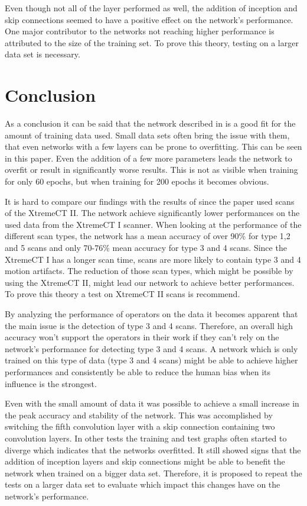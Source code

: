 \documentclass[
a4paper, 
12pt,
grayscalebody, %
abstract=on,
twoside, BCOR10mm, 12pt, DIV13,headinclude, footexclude, final, abstracton, openright
]{ibireprt}
\numberwithin{equation}{chapter}
\numberwithin{table}{chapter}
\numberwithin{figure}{chapter}
\numberwithin{algorithm}{chapter}
\numberwithin{example}{chapter}
\numberwithin{example}{chapter}
\begin{document}
Even though not all of the layer performed as well, the addition of inception and skip connections seemed to have a positive effect on the network's performance. One major contributor to the networks not reaching higher performance is attributed to the size of the training set. To prove this theory, testing on a larger data set is necessary. 

\chapter{Conclusion}
As a conclusion it can be said that the network described in \citet{Walle2023} is a good fit for the amount of training data used. Small data sets often bring the issue with them, that even networks with a few layers can be prone to overfitting. This can be seen in this paper. Even the addition of a few more parameters leads the network to overfit or result in significantly worse results. This is not as visible when training for only 60 epochs, but when training for 200 epochs it becomes obvious.

It is hard to compare our findings with the results of \citet{Walle2023} since the paper used scans of the XtremeCT II. The network achieve significantly lower performances on the used data from the XtremeCT I scanner. When looking at the performance of the different scan types, the network has a mean accuracy of over 90\% for type 1,2 and 5 scans and only 70-76\% mean accuracy for type 3 and 4 scans. Since the XtremeCT I has a longer scan time, scans are more likely to contain type 3 and 4 motion artifacts. The reduction of those scan types, which might be possible by using the XtremeCT II, might lead our network to achieve better performances. To prove this theory a test on XtremeCT II scans is recommend. 

By analyzing the performance of operators on the data it becomes apparent that the main issue is the detection of type 3 and 4 scans. Therefore, an overall high accuracy won't support the operators in their work if they can't rely on the network's performance for detecting type 3 and 4 scans. A network which is only trained on this type of data (type 3 and 4 scans) might be able to achieve higher performances and consistently be able to reduce the human bias when its influence is the strongest. 

Even with the small amount of data it was possible to achieve a small increase in the peak accuracy and stability of the network. This was accomplished by switching the fifth convolution layer with a skip connection containing two convolution layers. In other tests the training and test graphs often started to diverge which indicates that the networks overfitted. It still showed signs that the addition of inception layers and skip connections might be able to benefit the network when trained on a bigger data set. Therefore, it is proposed to repeat the tests on a larger data set to evaluate which impact this changes have on the network's performance. 
\end{document}
